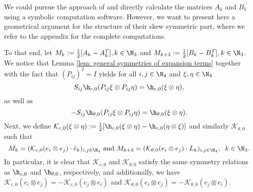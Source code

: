 We could pursue the approach of \cite{Alouges2017} and directly calculate the matrices $A_k$ and $B_k$ using a symbolic computation software. However, we want to present here a geometrical argument for the structure of their skew symmetric part, where we refer to the appendix for the complete computations.

To that end, let $M_k := \tfrac{1}{2}[A_k - A_k^T], k \in \N_3$ and $M_{k + 3} := \tfrac{1}{2}[B_k - B_k^T], k \in \N_3$. We notice that Lemma \ref{lem: general symmetries of expansion terms} together with the fact that $(P_{ij})^2 = I$ yields for all $i,j \in \N_4$ and $\xi, \eta \in \N_4$
\begin{equation}
	S_{ij} \h_{c,0}(P_{ij} \xi \otimes P_{ij} \eta) = \h_{c,0}(\xi \otimes \eta),
\end{equation}
as well as
\begin{equation}
	-S_{ij} \h_{\theta,0}(P_{ij} \xi \otimes P_{ij} \eta) = \h_{\theta, 0}(\xi \otimes \eta).
\end{equation}
Next, we define $\mathcal{K}_{c,0}(\xi \otimes \eta) := \tfrac{1}{2}[\h_{c,0}(\xi \otimes \eta) - \h_{c,0}(\eta \otimes \xi)]$ and similarly $\mathcal{K}_{\theta,0}$ such that
\begin{equation}
	M_k = (\mathcal{K}_{c,0}(e_i \otimes e_j) \cdot \hat{e}_k)_{i,j \in \N_4} \text{ and } M_{k + 3} = (\mathcal{K}_{\theta,0}(e_i \otimes e_j) \cdot L_k)_{i,j \in \N_4},\;\; k \in \N_3.
\end{equation} 
In particular, it is clear that $\mathcal{K}_{c,0}$ and $\mathcal{K}_{\theta,0}$ satisfy the same symmetry relations as $\h_{c,0}$ and $\h_{\theta, 0}$, respectively, and additionally, we have $\mathcal{K}_{c,0}(e_i \otimes e_j) = - \mathcal{K}_{c,0}(e_j \otimes e_i)$ and $\mathcal{K}_{\theta,0}(e_i \otimes e_j) = - \mathcal{K}_{\theta,0}(e_j \otimes e_i)$.

